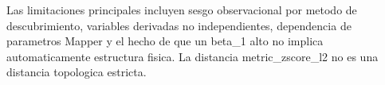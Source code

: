 Las limitaciones principales incluyen sesgo observacional por metodo de descubrimiento, variables derivadas no independientes, dependencia de parametros Mapper y el hecho de que un beta_1 alto no implica automaticamente estructura fisica. La distancia metric_zscore_l2 no es una distancia topologica estricta.
